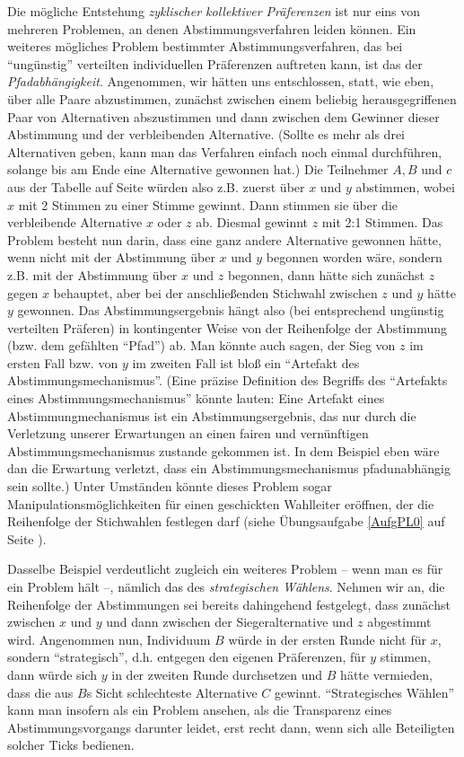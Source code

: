 Die mögliche Entstehung {\em zyklischer kollektiver Präferenzen} ist nur eins von
mehreren Problemen, an denen Abstimmungsverfahren leiden können. Ein weiteres
mögliches Problem bestimmter Abstimmungsverfahren, das bei "`ungünstig"'
verteilten individuellen Präferenzen auftreten kann, ist das der {\em
Pfadabhängigkeit}. Angenommen, wir hätten uns entschlossen, statt, wie eben, über
alle Paare abzustimmen, zunächst zwischen einem beliebig herausgegriffenen Paar
von Alternativen abszustimmen und dann zwischen dem Gewinner dieser Abstimmung
und der verbleibenden Alternative. (Sollte es mehr als drei Alternativen geben,
kann man das Verfahren einfach noch einmal durchführen, solange bis am Ende eine
Alternative gewonnen hat.) Die Teilnehmer $A,B$ und $c$ aus der Tabelle auf Seite
\pageref{condorcetParadoxTabelle} würden also z.B. zuerst über $x$ und $y$
abstimmen, wobei $x$ mit 2 Stimmen zu einer Stimme gewinnt. Dann stimmen sie über die
verbleibende Alternative $x$ oder $z$ ab. Diesmal gewinnt $z$ mit 2:1
Stimmen. Das Problem
besteht nun darin, dass eine ganz andere Alternative gewonnen hätte, wenn nicht
mit der Abstimmung über $x$ und $y$ begonnen worden wäre, sondern z.B. mit der
Abstimmung über $x$ und $z$ begonnen, dann hätte sich zunächst $z$ gegen $x$
behauptet, aber bei der anschließenden Stichwahl zwischen $z$ und $y$ hätte $y$
gewonnen. Das Abstimmungsergebnis hängt also (bei entsprechend ungünstig
verteilten Präferen) in kontingenter Weise von der Reihenfolge der Abstimmung
(bzw. dem gefählten "`Pfad"') ab. Man könnte auch sagen, der Sieg von $z$ im
ersten Fall bzw. von $y$ im zweiten Fall ist bloß ein "`Artefakt des
Abstimmungsmechanismus"'. (Eine präzise Definition des Begriffs des "`Artefakts
eines Abstimmungsmechanismus"' könnte lauten: Eine Artefakt eines
Abstimmungmechanismus ist ein Abstimmungsergebnis, das nur durch die Verletzung
unserer Erwartungen an einen fairen und vernünftigen Abstimmungsmechanismus
zustande gekommen ist. In dem Beispiel eben wäre dan die Erwartung verletzt, dass
ein Abstimmungsmechanismus pfadunabhängig sein sollte.) Unter Umständen könnte
dieses Problem sogar Manipulationsmöglichkeiten für einen geschickten
Wahlleiter eröffnen, der die Reihenfolge der Stichwahlen festlegen darf (siehe
Übungsaufgabe \ref{AufgPL0} auf Seite \pageref{AufgPL0}). 

Dasselbe Beispiel verdeutlicht zugleich ein weiteres Problem -- wenn man es für
ein Problem hält --, nämlich das des {\em strategischen Wählens}.
 Nehmen wir an, die Reihenfolge der Abstimmungen
sei bereits dahingehend festgelegt, dass zunächst zwischen $x$ und $y$ und dann
zwischen der Siegeralternative und $z$ abgestimmt wird. Angenommen nun,
Individuum $B$ würde in der ersten Runde nicht für $x$, sondern "`strategisch"',
d.h. entgegen den eigenen Präferenzen, für $y$ stimmen, dann würde sich $y$ in
der zweiten Runde durchsetzen und $B$ hätte vermieden, dass die aus $B$s Sicht
schlechteste Alternative $C$ gewinnt. "`Strategisches Wählen"' kann man insofern
als ein Problem ansehen, als die Transparenz eines Abstimmungsvorgangs darunter
leidet, erst recht dann, wenn sich alle Beteiligten solcher Ticks bedienen.
  
